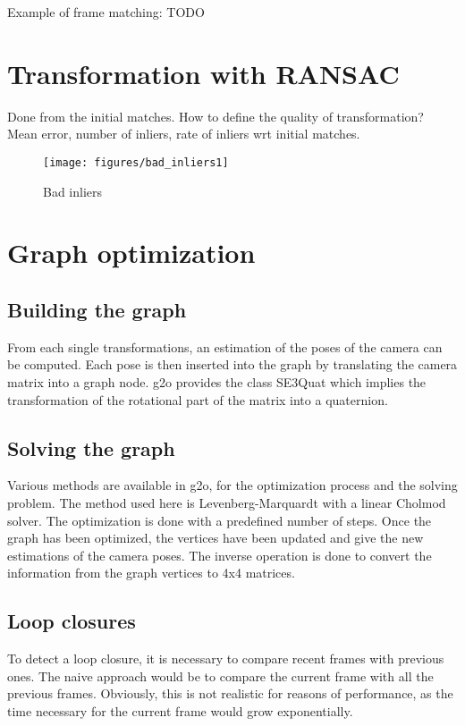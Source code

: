 Example of frame matching: TODO

\section{Transformation with RANSAC}

Done from the initial matches.
How to define the quality of transformation? 
Mean error, number of inliers, rate of inliers wrt initial matches.

\begin{figure}[h]
\centering
\texttt{[image: figures/bad\_inliers1]}
\caption{Bad inliers}
\end{figure}

\section{Graph optimization}
\subsection{Building the graph}

From each single transformations, an estimation of the poses of the camera can be computed. Each pose is then inserted into the graph by translating the camera matrix into a graph node. g2o provides the class SE3Quat which implies the transformation of the rotational part of the matrix into a quaternion.

\subsection{Solving the graph}

Various methods are available in g2o, for the optimization process and the solving problem. The method used here is Levenberg-Marquardt with a linear Cholmod solver. The optimization is done with a predefined number of steps. Once the graph has been optimized, the vertices have been updated and give the new estimations of the camera poses. The inverse operation is done to convert the information from the graph vertices to 4x4 matrices.

\subsection{Loop closures}

To detect a loop closure, it is necessary to compare recent frames with previous ones. The naive approach would be to compare the current frame with all the previous frames. Obviously, this is not realistic for reasons of performance, as the time necessary for the current frame would grow exponentially.

